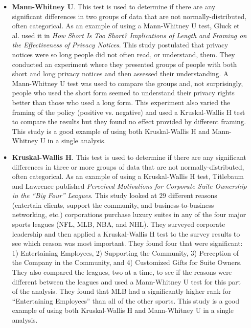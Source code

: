\begin{itemize}
	\item \textbf{Mann-Whitney U}. This test is used to determine if there are any significant differences in two groups of data that are not normally-distributed, often categorical. As an example of using a Mann-Whitney U test, Gluck et al. used it in \textit{How Short Is Too Short? Implications of Length and Framing on the Effectiveness of Privacy Notices}\cite{gluck2016short}. This study postulated that privacy notices were so long people did not often read, or understand, them. They conducted an experiment where they presented groups of people with both short and long privacy notices and then assessed their understanding. A Mann-Whitney U test was used to compare the groups and, not surprisingly, people who used the short form seemed to understand their privacy rights better than those who used a long form. This experiment also varied the framing of the policy (positive vs. negative) and used a Kruskal-Wallis H test to compare the results but they found no effect provided by different framing. This study is a good example of using both Kruskal-Wallis H and Mann-Whitney U in a single analysis.
	
	\item \textbf{Kruskal-Wallis H}. This test is used to determine if there are any significant differences in three or more groups of data that are not normally-distributed, often categorical. As an example of using a Kruskal-Wallis H test, Titlebaum and Lawrence published \textit{Perceived Motivations for Corporate Suite Ownership in the ``Big Four'' Leagues}\cite{titlebaum2016perceived}. This study looked at $ 29 $ different reasons (entertain clients, support the community, and business-to-business networking, etc.) corporations purchase luxury suites in any of the four major sports leagues (NFL, MLB, NBA, and NHL). They surveyed corporate leadership and then applied a Kruskal-Wallis H test to the survey results to see which reason was most important. They found four that were significant: 1) Entertaining Employees, 2) Supporting the Community, 3) Perception of the Company in the Community, and 4) Customized Gifts for Suite Owners. They also compared the leagues, two at a time, to see if the reasons were different between the leagues and used a Mann-Whitney U test for this part of the analysis. They found that MLB had a significantly higher rank for ``Entertaining Employees'' than all of the other sports. This study is a good example of using both Kruskal-Wallis H and Mann-Whitney U in a single analysis.
\end{itemize}

